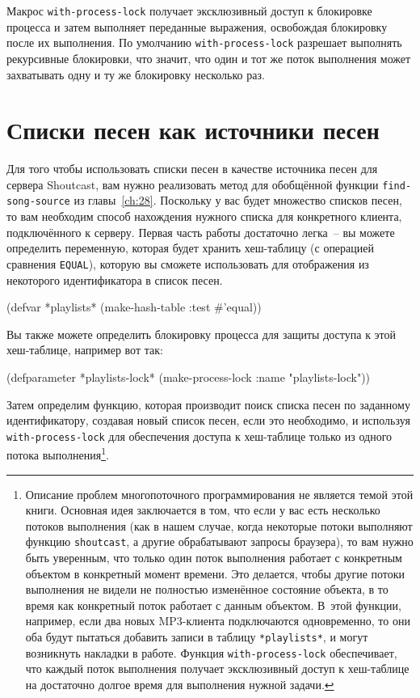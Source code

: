 Макрос \lstinline{with-process-lock} получает эксклюзивный доступ к блокировке процесса и
затем выполняет переданные выражения, освобождая блокировку после их выполнения.  По
умолчанию \lstinline{with-process-lock} разрешает выполнять рекурсивные блокировки, что
значит, что один и тот же поток выполнения может захватывать одну и ту же блокировку
несколько раз.

\section{Списки песен как источники песен}

Для того чтобы использовать списки песен в качестве источника песен для сервера
Shoutcast, вам нужно реализовать метод для обобщённой функции \lstinline{find-song-source} из
главы~\ref{ch:28}.  Поскольку у вас будет множество списков песен, то вам необходим способ
нахождения нужного списка для конкретного клиента, подключённого к серверу.  Первая часть
работы достаточно легка~-- вы можете определить переменную, которая будет хранить
хеш-таблицу (с операцией сравнения \lstinline{EQUAL}), которую вы сможете использовать для
отображения из некоторого идентификатора в список песен.

\begin{myverb}
(defvar *playlists* (make-hash-table :test #'equal))
\end{myverb}

Вы также можете определить блокировку процесса для защиты доступа к этой хеш-таблице,
например вот так:

\begin{myverb}
(defparameter *playlists-lock* (make-process-lock :name "playlists-lock"))
\end{myverb}

Затем определим функцию, которая производит поиск списка песен по заданному
идентификатору, создавая новый список песен, если это необходимо, и используя
\lstinline{with-process-lock} для обеспечения доступа к хеш-таблице только из одного потока
выполнения\footnote{Описание проблем многопоточного программирования не является темой
  этой книги. Основная идея заключается в том, что если у вас есть несколько потоков
  выполнения (как в нашем случае, когда некоторые потоки выполняют функцию
  \lstinline{shoutcast}, а другие обрабатывают запросы браузера), то вам нужно быть уверенным,
  что только один поток выполнения работает с конкретным объектом в конкретный момент
  времени.  Это делается, чтобы другие потоки выполнения не видели не полностью изменённое
  состояние объекта, в то время как конкретный поток работает с данным объектом.  В~этой
  функции, например, если два новых MP3-клиента подключаются одновременно, то они оба
  будут пытаться добавить записи в таблицу \lstinline{*playlists*}, и могут возникнуть накладки
  в работе.  Функция \lstinline{with-process-lock} обеспечивает, что каждый поток выполнения
  получает эксклюзивный доступ к хеш-таблице на достаточно долгое время для выполнения
  нужной задачи.}\hspace{\footnotenegspace}.

